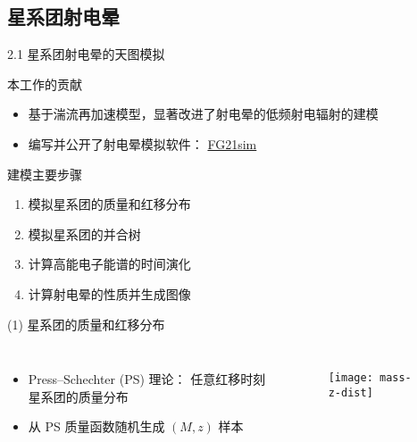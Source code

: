 \documentclass{beamer}
\begin{document}
\subsection{星系团射电晕}

\begin{frame}{2.1 星系团射电晕的天图模拟}
  \begin{alertblock}{本工作的贡献}
    \begin{itemize}
      \item 基于湍流再加速模型，显著改进了射电晕的低频射电辐射的建模
      \item 编写并公开了射电晕模拟软件：
        \href{https://github.com/liweitianux/fg21sim}{FG21sim}
    \end{itemize}
  \end{alertblock}
  \begin{alertblock}{建模主要步骤}
    \begin{enumerate}
      \item 模拟星系团的质量和红移分布
      \item 模拟星系团的并合树
      \item 计算高能电子能谱的时间演化
      \item 计算射电晕的性质并生成图像
    \end{enumerate}
  \end{alertblock}
\end{frame}

\begin{frame}[t]
  \begin{alertblock}{(1) 星系团的质量和红移分布}
  \end{alertblock}
  \begin{columns}
    \begin{itemize}
      \item Press--Schechter (PS) 理论：
        任意红移时刻星系团的质量分布
      \item 从 PS 质量函数随机生成 $(M, z)$ 样本
    \end{itemize}

    \begin{figure}
      \centering
      \texttt{[image: mass-z-dist]}
    \end{figure}
  \end{columns}
\end{frame}
\end{document}
